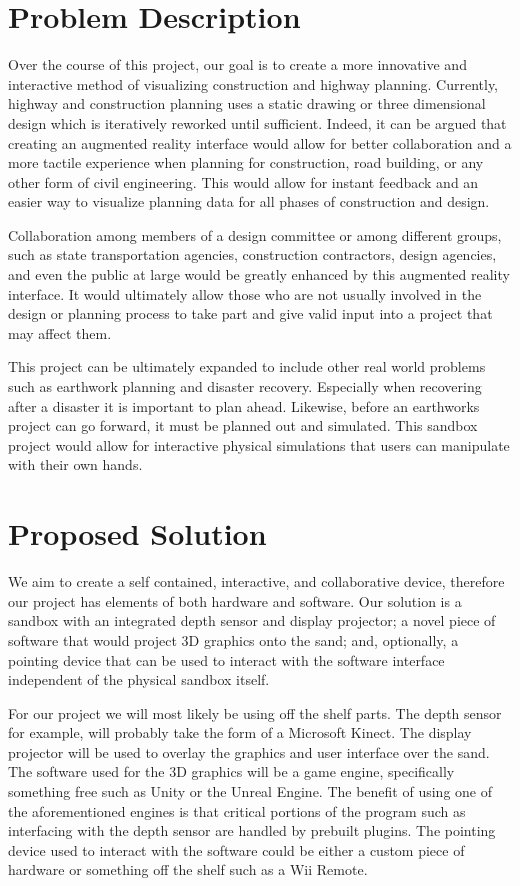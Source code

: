 \documentclass[onecolumn, draftclsnofoot,10pt, compsoc]{IEEEtran}
\begin{document}
\section{Problem Description}
Over the course of this project, our goal is to create a more innovative and interactive method of visualizing construction and highway planning.
Currently, highway and construction planning uses a static drawing or three dimensional design which is iteratively reworked until sufficient.
Indeed, it can be argued that creating an augmented reality interface would allow for better collaboration and a more tactile experience when planning for construction, road building, or any other form of civil engineering.
This would allow for instant feedback and an easier way to visualize planning data for all phases of construction and design.
\par
Collaboration among members of a design committee or among different groups, such as state transportation agencies, construction contractors, design agencies, and even the public at large would be greatly enhanced by this augmented reality interface.
It would ultimately allow those who are not usually involved in the design or planning process to take part and give valid input into a project that may affect them.
\par
This project can be ultimately expanded to include other real world  problems such as earthwork planning and disaster recovery.
Especially when recovering after a disaster it is important to plan ahead. Likewise, before an earthworks project can go forward, it must be planned out and simulated.
This sandbox project would allow for interactive physical simulations that users can manipulate with their own hands.

\section{Proposed Solution}
We aim to create a self contained, interactive, and collaborative device, therefore our project has elements of both hardware and software.
Our solution is a sandbox with an integrated depth sensor and display projector; a novel piece of software that would project 3D graphics onto the sand; and, optionally, a pointing device that can be used to interact with the software interface independent of the physical sandbox itself.
\par
For our project we will most likely be using off the shelf parts.
The depth sensor for example, will probably take the form of a Microsoft Kinect.
The display projector will be used to overlay the graphics and user interface over the sand.
The software used for the 3D graphics will be a game engine, specifically something free such as Unity or the Unreal Engine.
The benefit of using one of the aforementioned engines is that critical portions of the program such as interfacing with the depth sensor are handled by prebuilt plugins.
The pointing device used to interact with the software could be either a custom piece of hardware or something off the shelf such as a Wii Remote.
\end{document}
